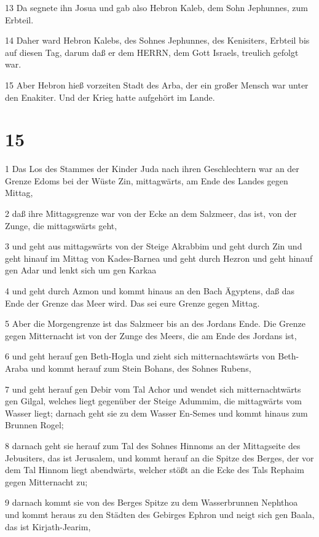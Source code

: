 \par 13 Da segnete ihn Josua und gab also Hebron Kaleb, dem Sohn Jephunnes, zum Erbteil.
\par 14 Daher ward Hebron Kalebs, des Sohnes Jephunnes, des Kenisiters, Erbteil bis auf diesen Tag, darum daß er dem HERRN, dem Gott Israels, treulich gefolgt war.
\par 15 Aber Hebron hieß vorzeiten Stadt des Arba, der ein großer Mensch war unter den Enakiter. Und der Krieg hatte aufgehört im Lande.

\chapter{15}

\par 1 Das Los des Stammes der Kinder Juda nach ihren Geschlechtern war an der Grenze Edoms bei der Wüste Zin, mittagwärts, am Ende des Landes gegen Mittag,
\par 2 daß ihre Mittagsgrenze war von der Ecke an dem Salzmeer, das ist, von der Zunge, die mittagswärts geht,
\par 3 und geht aus mittagswärts von der Steige Akrabbim und geht durch Zin und geht hinauf im Mittag von Kades-Barnea und geht durch Hezron und geht hinauf gen Adar und lenkt sich um gen Karkaa
\par 4 und geht durch Azmon und kommt hinaus an den Bach Ägyptens, daß das Ende der Grenze das Meer wird. Das sei eure Grenze gegen Mittag.
\par 5 Aber die Morgengrenze ist das Salzmeer bis an des Jordans Ende. Die Grenze gegen Mitternacht ist von der Zunge des Meers, die am Ende des Jordans ist,
\par 6 und geht herauf gen Beth-Hogla und zieht sich mitternachtswärts von Beth-Araba und kommt herauf zum Stein Bohans, des Sohnes Rubens,
\par 7 und geht herauf gen Debir vom Tal Achor und wendet sich mitternachtwärts gen Gilgal, welches liegt gegenüber der Steige Adummim, die mittagwärts vom Wasser liegt; darnach geht sie zu dem Wasser En-Semes und kommt hinaus zum Brunnen Rogel;
\par 8 darnach geht sie herauf zum Tal des Sohnes Hinnoms an der Mittagseite des Jebusiters, das ist Jerusalem, und kommt herauf an die Spitze des Berges, der vor dem Tal Hinnom liegt abendwärts, welcher stößt an die Ecke des Tals Rephaim gegen Mitternacht zu;
\par 9 darnach kommt sie von des Berges Spitze zu dem Wasserbrunnen Nephthoa und kommt heraus zu den Städten des Gebirges Ephron und neigt sich gen Baala, das ist Kirjath-Jearim,
